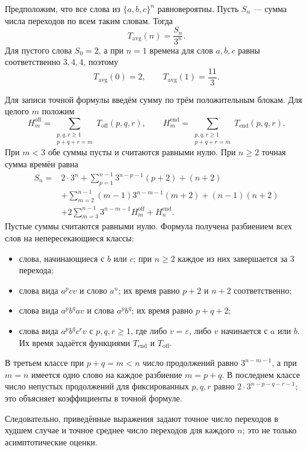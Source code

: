 \documentclass[12pt]{article}
\begin{document}
Предположим, что все слова из $\{a,b,c\}^n$ равновероятны.
Пусть $S_n$ --- сумма числа переходов по всем таким словам. Тогда
\[
T_{\mathrm{avg}}(n)=\frac{S_n}{3^n}.
\]
Для пустого слова $S_0=2$, а при $n=1$ времена для слов $a,b,c$
равны соответственно $3,4,4$, поэтому
\[
T_{\mathrm{avg}}(0)=2,\qquad T_{\mathrm{avg}}(1)=\frac{11}{3}.
\]

Для записи точной формулы введём сумму по трём положительным блокам.
Для целого $m$ положим
\[
H_m^{\mathrm{off}}=
\sum_{\substack{p,q,r\geq1\\p+q+r=m}}
T_{\mathrm{off}}(p,q,r),\qquad
H_m^{\mathrm{end}}=
\sum_{\substack{p,q,r\geq1\\p+q+r=m}}
T_{\mathrm{end}}(p,q,r).
\]
При $m<3$ обе суммы пусты и считаются равными нулю.
При $n\geq2$ точная сумма времён равна
\[
\begin{aligned}
S_n={}&2\cdot3^n
 +\sum_{p=1}^{n-1}3^{n-p-1}(p+2)+(n+2)\\
&+\sum_{m=2}^{n-1}(m-1)3^{n-m-1}(m+2)
 +(n-1)(n+2)\\
&+2\sum_{m=3}^{n-1}3^{n-m-1}H_m^{\mathrm{off}}
 +H_n^{\mathrm{end}}.
\end{aligned}
\]
Пустые суммы считаются равными нулю. Формула получена разбиением всех
слов на непересекающиеся классы:
\begin{itemize}
\item слова, начинающиеся с $b$ или $c$; при $n\geq2$ каждое из них
      завершается за $3$ перехода;
\item слова вида $a^p c v$ и слово $a^n$; их время равно $p+2$
      и $n+2$ соответственно;
\item слова вида $a^p b^q a v$ и слова $a^p b^q$;
      их время равно $p+q+2$;
\item слова вида $a^p b^q c^r v$ с $p,q,r\geq1$, где либо
      $v=\varepsilon$, либо $v$ начинается с $a$ или $b$.
      Их время задаётся функциями $T_{\mathrm{end}}$ и
      $T_{\mathrm{off}}$.
\end{itemize}
В третьем классе при $p+q=m<n$ число продолжений равно
$3^{n-m-1}$, а при $m=n$ имеется одно слово на каждое разбиение
$m=p+q$. В последнем классе число непустых продолжений для фиксированных
$p,q,r$ равно $2\cdot3^{n-p-q-r-1}$; это объясняет коэффициенты
в точной формуле.

Следовательно, приведённые выражения задают точное число переходов
в худшем случае и точное среднее число переходов для каждого $n$;
это не только асимптотические оценки.
\end{document}

